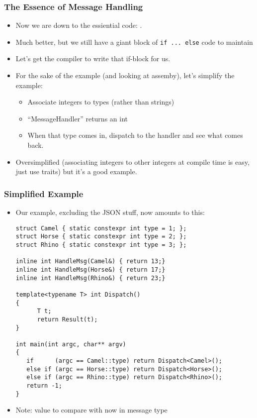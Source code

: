 \begin{frame}[fragile,t]
\frametitle{The Essence of Message Handling}
\begin{itemize}[<+->]
\item Now we are down to the essiential code: .
\item Much better, but we still have a giant block of \texttt{if
  ... else} code to maintain
\vskip 12pt
\item Let's get the compiler to write that if-block for us.
\vskip 12pt
\item For the sake of the example (and looking at assemby), let's
  simplify the example:
  \begin{itemize}
    \item Associate integers to types (rather than strings)
    \item ``MessageHandler'' returns an int
    \item When that type comes in, dispatch to the handler and see
      what comes back.
\end{itemize}
\item Oversimplified (associating integers to other integers at
  compile time is easy, just use traits) but it's a good example.
\end{itemize}
\end{frame}



\begin{frame}[fragile,t]
\frametitle{Simplified Example}
\begin{itemize}[<+->]
\item Our example, excluding the JSON stuff, now amounts to this:
{\scriptsize\begin{verbatim}
struct Camel { static constexpr int type = 1; };
struct Horse { static constexpr int type = 2; };
struct Rhino { static constexpr int type = 3; };

inline int HandleMsg(Camel&) { return 13;}
inline int HandleMsg(Horse&) { return 17;}
inline int HandleMsg(Rhino&) { return 23;}

template<typename T> int Dispatch()
{
      T t;
      return Result(t);
} 

int main(int argc, char** argv)
{
   if      (argc == Camel::type) return Dispatch<Camel>();
   else if (argc == Horse::type) return Dispatch<Horse>();
   else if (argc == Rhino::type) return Dispatch<Rhino>();
   return -1;
}

\end{verbatim}
}

\item Note: value to compare with now in message type
\end{itemize}

\end{frame}


